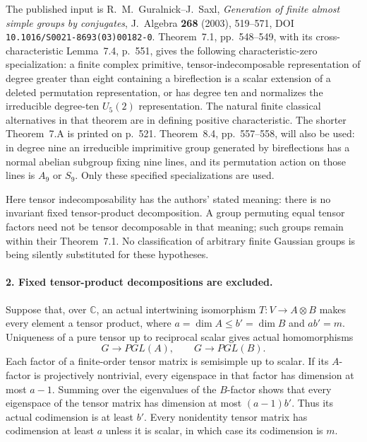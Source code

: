 The published input is R.~M.~Guralnick--J.~Saxl,
\emph{Generation of finite almost simple groups by conjugates},
J.~Algebra \textbf{268} (2003), 519--571,
DOI \texttt{10.1016/S0021-8693(03)00182-0}.
Theorem~7.1, pp.~548--549, with its cross-characteristic
Lemma~7.4, p.~551, gives the following characteristic-zero
specialization: a finite complex primitive, tensor-indecomposable
representation of degree greater than eight containing a
bireflection is a scalar extension of a deleted permutation
representation, or has degree ten and normalizes the irreducible
degree-ten \(U_5(2)\) representation. The natural finite
classical alternatives in that theorem are in defining positive
characteristic. The shorter Theorem~7.A is printed on p.~521.
Theorem~8.4, pp.~557--558, will also be used: in degree nine an
irreducible imprimitive group generated by bireflections has a
normal abelian subgroup fixing nine lines, and its permutation
action on those lines is \(A_9\) or \(S_9\).
Only these specified specializations are used.

Here tensor indecomposability has the authors' stated meaning:
there is no invariant fixed tensor-product decomposition. A group
permuting equal tensor factors need not be tensor decomposable in
that meaning; such groups remain within their Theorem~7.1.
No classification of arbitrary finite Gaussian groups is being
silently substituted for these hypotheses.

\paragraph{2. Fixed tensor-product decompositions are excluded.}
Suppose that, over \(\mathbb C\), an actual intertwining
isomorphism \(T:V\to A\otimes B\) makes every element a
tensor product, where \(a=\dim A\le b'=\dim B\) and
\(ab'=m\). Uniqueness of a pure tensor up to reciprocal scalar
gives actual homomorphisms
\[
       G\longrightarrow PGL(A),\qquad G\longrightarrow PGL(B).
                                                               \tag{S37.3}
\]
Each factor of a finite-order tensor matrix is semisimple up to
scalar. If its \(A\)-factor is projectively nontrivial, every
eigenspace in that factor has dimension at most \(a-1\).
Summing over the eigenvalues of the \(B\)-factor shows that
every eigenspace of the tensor matrix has dimension at most
\((a-1)b'\). Thus its actual codimension is at least \(b'\).
Every nonidentity tensor matrix has codimension at least \(a\)
unless it is scalar, in which case its codimension is \(m\).


